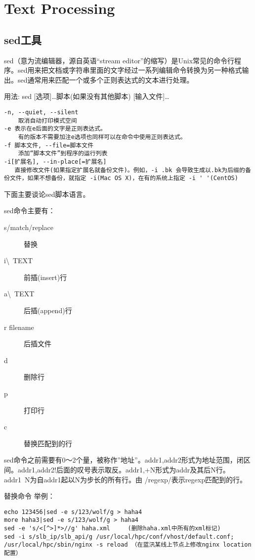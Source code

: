 \section{Text Processing}

\subsection{sed工具}
sed（意为流编辑器，源自英语“stream editor”的缩写）是Unix常见的命令行程序。sed用来把文档或字符串里面的文字经过一系列编辑命令转换为另一种格式输出。sed通常用来匹配一个或多个正则表达式的文本进行处理。

用法: sed [选项]\ldots {脚本(如果没有其他脚本)} [输入文件]\ldots

\begin{verbatim}
-n, --quiet, --silent
    取消自动打印模式空间
-e 表示在e后面的文字是正则表达式。
	有的版本不需要加注e选项也同样可以在命令中使用正则表达式。
-f 脚本文件, --file=脚本文件
    添加“脚本文件”到程序的运行列表
-i[扩展名], --in-place[=扩展名]
   直接修改文件(如果指定扩展名就备份文件)。例如，-i .bk 会导致生成以.bk为后缀的备份文件，如果不想备份，就指定 -i(Mac OS X)，在有的系统上指定 -i ' '(CentOS)
\end{verbatim}

下面主要谈论sed脚本语言。


sed命令主要有：
\begin{description}
    \item[s/match/replace]替换
    \item[i\textbackslash\ TEXT]前插(insert)行
    \item[a\textbackslash\ TEXT]后插(append)行
    \item[r filename]后插文件
    \item[d]删除行
    \item[p]打印行
    \item[c]替换匹配到的行
\end{description}

sed命令之前需要有0～2个量，被称作''地址''。addr1,addr2形式为地址范围，闭区间。addr1,addr2!后面的叹号表示取反。addr1,+N形式为addr及其后N行。addr1~N为自addr1起以N为步长的所有行。由 /regexp/表示regexp匹配到的行。

替换命令 举例：
\begin{verbatim}
echo 123456|sed -e s/123/wolf/g > haha4
more haha3|sed -e s/123/wolf/g > haha4
sed -e 's/<[^>]*>//g' haha.xml     (删除haha.xml中所有的xml标记)
sed -i s/slb_ip/slb_api/g /usr/local/hpc/conf/vhost/default.conf; /usr/local/hpc/sbin/nginx -s reload （在蓝汛某线上节点上修改nginx location配置）
\end{verbatim}



